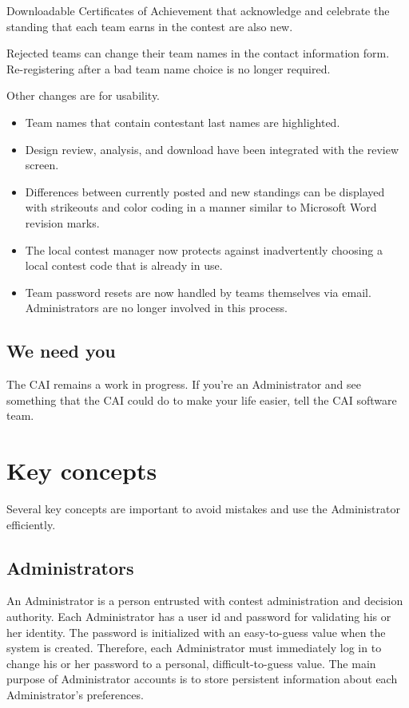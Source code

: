 \documentclass[11pt,letterpaper]{refart}
\begin{document}
Downloadable Certificates of Achievement that acknowledge and
celebrate the standing that each team earns in the contest are also
new.

Rejected teams can change their team names in the contact information
form. Re-registering after a bad team name choice is no longer required.

Other changes are for usability. 
\begin{itemize}
\item Team names that contain contestant last names are highlighted.
\item Design review, analysis, and download have been integrated with the review screen. 
\item Differences between currently posted and new standings can be displayed with 
  strikeouts and color coding in a manner similar to Microsoft Word revision marks. 
\item The local contest manager now protects against inadvertently choosing a local 
  contest code that is already in use.
\item Team password resets are now handled by teams themselves via email. Administrators
are no longer involved in this process.
\end{itemize}

\subsection{We need you}
The CAI remains a work in progress. If you're an Administrator and see
something that the CAI could do to make your life easier, tell the CAI
software team.

\section{Key concepts}
Several key concepts are important to avoid mistakes and use the
Administrator efficiently.

\subsection{Administrators}
An Administrator is a person entrusted with contest administration and
decision authority. Each Administrator has a user id and password for
validating his or her identity. The password is initialized with an
easy-to-guess value when the system is created. Therefore, each
Administrator must immediately log in to change his or her password to
a personal, difficult-to-guess value. The main purpose of
Administrator accounts is to store persistent information about each
Administrator's preferences.
\end{document}
